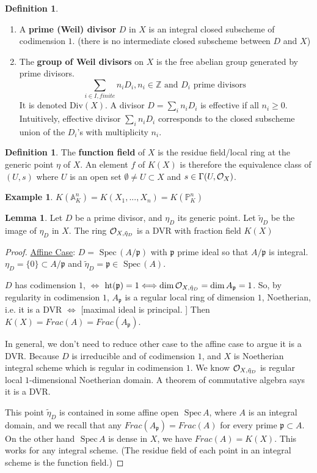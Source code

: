 \documentclass[11pt]{article}
\theoremstyle{definition}
\newtheorem{lemma}[thm]{Lemma}
\newtheorem{dfn}[thm]{Definition}
\newtheorem{ex}[thm]{Example}
\newcommand{\spec}{\text{ Spec}\,}
\newcommand{\affn}{\mathbb A}
\newcommand{\proj}{\mathbb P}
\newcommand{\intg}{\mathbb Z}
\newcommand{\scp}{{\mathfrak p}}
\newcommand{\calo}{{\cal O}}
\newcommand{\Llrta}{\Longleftrightarrow}
\begin{document}
\begin{dfn}
\ \begin{enumerate}[label=(\arabic*)]
\item  A \textbf{prime (Weil) divisor} $D$ in $X$ is an integral closed subscheme of codimension $1$. (there is no intermediate closed subscheme between $D$ and $X$)
\item The \textbf{group of Weil divisors} on $X$ is the free abelian group generated by  prime divisors.
$$
\sum_{i\in I, finite} n_i D_i
, n_i\in \intg\text{ and } D_i \text{ prime divisors }
$$
It is denoted $\text{Div}(X)$. A divisor $D=\sum_i n_i D_i$ is effective if all $n_i\geq 0$. Intuitively, effective divisor $\sum_i n_i D_i$ corresponds to the closed subscheme union of the $D_i$'s with multiplicity $n_i$.
\end{enumerate}
\end{dfn}
\begin{dfn}
The \textbf{function field} of $X$ is the residue field/local ring at the generic point $\eta$ of $X$. An element $f$ of $K(X)$ is therefore the equivalence class of $(U,s)$ where $U$ is 
an open set $\emptyset \neq U\subset X$ and $s\in \Gamma(U,\calo_X)$.
\end{dfn}
\begin{ex}
$K(\affn^n_K)=K(X_1,...,X_n)=K(\proj^n_K)$
\end{ex}
\begin{lemma}
Let $D$ be a prime divisor, and $\eta_D$ its generic point. Let $\tilde{\eta}_D$ be the image of $\eta_D$ in $X$. The ring 
$\calo_{X,\tilde{\eta}_D}$ is a DVR with fraction field $K(X)$
\end{lemma}
\begin{proof}
\underline{Affine Case}: $D=\spec(A/\scp)$ with $\scp$ prime ideal so that $A/\scp$ is integral. $\eta_D=\{0\}\subset A/\scp$ and $\tilde{\eta}_D=\scp\in \spec(A)$.

$D$ has codimension $1$, $\Llrta$ $\text{ht}(\scp)=1\Llrta \dim \calo_{X,\tilde{\eta}_D}=\dim A_\scp=1$. So, by regularity in codimension $1$, $A_\scp$ is a regular local ring of dimension $1$, Noetherian, i.e. it is a DVR $\Llrta $ [maximal ideal is principal. ] Then $K(X)=Frac(A)=Frac(A_\scp)$. 

In general, we don't need to reduce other case to the affine case to argue it is a DVR. Because $D$ is irreducible and of codimension $1$, and $X$ is Noetherian integral scheme which is regular in codimension $1$. We know $\calo_{X,\tilde{\eta}_D}$ is regular local $1$-dimensional Noetherian domain. A theorem of commutative algebra says it is a DVR.

This point $\tilde{\eta}_D$ is contained in some affine open $\spec A$, where $A$ is an integral domain, and we recall that any $Frac(A_\scp)=Frac(A)$ for every prime $\scp \subset A$. On the other hand $\spec A$ is dense in $X$, we have $Frac(A)=K(X)$. This works for any  integral scheme. (The residue field of each point in an integral scheme is the function field.)
\end{proof}
\end{document}
